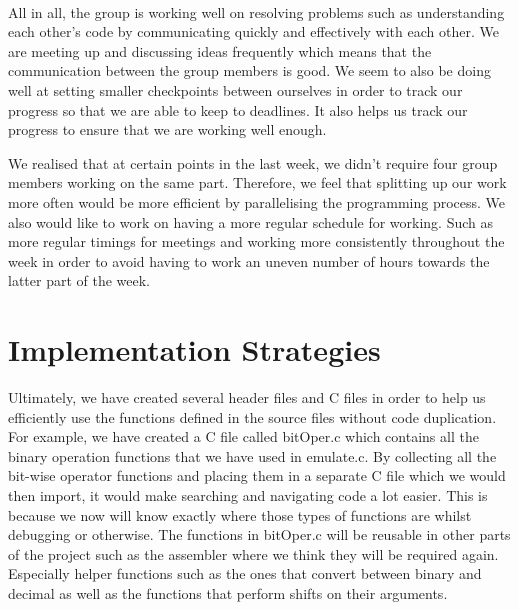 \documentclass[11pt]{article}
\begin{document}
\paragraph{}
All in all, the group is working well on resolving problems such as understanding each other's code by communicating quickly and effectively with each other. We are meeting up and discussing ideas frequently which means that the communication between the group members is good. We seem to also be doing well at setting smaller checkpoints between ourselves in order to track our progress so that we are able to keep to deadlines. It also helps us track our progress to ensure that we are working well enough. 

We realised that at certain points in the last week, we didn't require four group members working on the same part. Therefore, we feel that splitting up our work more often would be more efficient by parallelising the programming process. We also would like to work on having a more regular schedule for working. Such as more regular timings for meetings and working more consistently throughout the week in order to avoid having to work an uneven number of hours towards the latter part of the week.

\section{Implementation Strategies}

Ultimately, we have created several header files and C files in order to help us efficiently use the functions defined in the source files without code duplication. For example, we have created a C file called bitOper.c which contains all the binary operation functions that we have used in emulate.c. By collecting all the bit-wise operator functions and placing them in a separate C file which we would then import, it would make searching and navigating code a lot easier. This is because we now will know exactly where those types of functions are whilst debugging or otherwise. The functions in bitOper.c will be reusable in other parts of the project such as the assembler where we think they will be required again. Especially helper functions such as the ones that convert between binary and decimal as well as the functions that perform shifts on their arguments.
\end{document}
